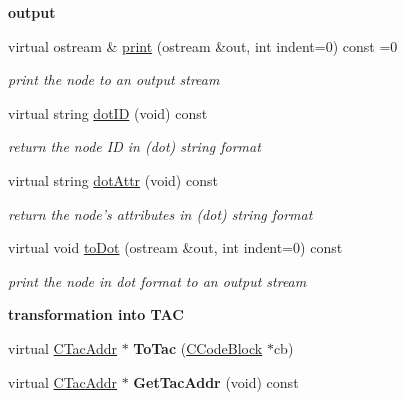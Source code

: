 \begin{Indent}{\bf output}\par
\begin{DoxyCompactItemize}
\item 
virtual ostream \& \hyperlink{classCAstNode_aff4622f85ee405f9b9257f91fb3a830e}{print} (ostream \&out, int indent=0) const =0
\begin{DoxyCompactList}\small\item\em print the node to an output stream \end{DoxyCompactList}\item 
virtual string \hyperlink{classCAstNode_a0cabcca882c1a3e48ffb953581db18ab}{dot\-I\-D} (void) const 
\begin{DoxyCompactList}\small\item\em return the node I\-D in (dot) string format \end{DoxyCompactList}\item 
virtual string \hyperlink{classCAstNode_a9a30718a50f12845e03181846dab1432}{dot\-Attr} (void) const 
\begin{DoxyCompactList}\small\item\em return the node's attributes in (dot) string format \end{DoxyCompactList}\item 
virtual void \hyperlink{classCAstNode_ac7b5751f26de6f86fb3b9175caa15391}{to\-Dot} (ostream \&out, int indent=0) const 
\begin{DoxyCompactList}\small\item\em print the node in dot format to an output stream \end{DoxyCompactList}\end{DoxyCompactItemize}
\end{Indent}
\begin{Indent}{\bf transformation into T\-A\-C}\par
\begin{DoxyCompactItemize}
\item 
\hypertarget{classCAstNode_a607122a517fdbaa1ab5b1d6b5de01ca9}{virtual \hyperlink{classCTacAddr}{C\-Tac\-Addr} $\ast$ {\bfseries To\-Tac} (\hyperlink{classCCodeBlock}{C\-Code\-Block} $\ast$cb)}\label{classCAstNode_a607122a517fdbaa1ab5b1d6b5de01ca9}

\item 
\hypertarget{classCAstNode_a4b4eee9870389922a658d35d56a451c4}{virtual \hyperlink{classCTacAddr}{C\-Tac\-Addr} $\ast$ {\bfseries Get\-Tac\-Addr} (void) const }\label{classCAstNode_a4b4eee9870389922a658d35d56a451c4}

\end{DoxyCompactItemize}
\end{Indent}
